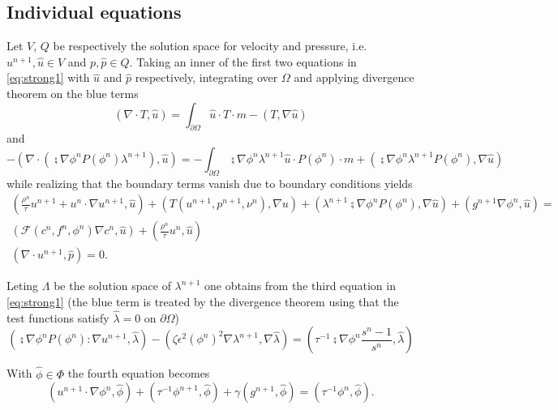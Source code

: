 \subsection*{Individual equations}
Let $V$, $Q$ be respectively the solution space for velocity and pressure, i.e.
$u^{n+1}, \hat{u}\in V$ and $p, \hat{p}\in Q$. Taking an inner of the first two equations
in \eqref{eq:strong1} with $\hat{u}$ and $\hat{p}$ respectively, integrating over
$\Omega$ and applying divergence theorem on the blue terms
%
\[
(\nabla\cdot T, \hat{u}) = \int_{\partial\Omega} \hat{u} \cdot T \cdot m - (T, \nabla{\hat{u}})
\]
and
\[
-(\nabla\cdot(\semi{\nabla \phi^n}P(\phi^n)\lambda^{n+1}), \hat{u})
=
-\int_{\partial\Omega} \semi{\nabla \phi^n}\lambda^{n+1} \hat{u}\cdot P(\phi^n)\cdot m
+
(\semi{\nabla \phi^n}\lambda^{n+1} P(\phi^n), \nabla\hat{u})
\]
%
while realizing that the boundary terms vanish due to boundary conditions
yields
%
\begin{equation}\label{eq:11}
\begin{aligned}
(\frac{\rho^n}{\tau}u^{n+1}+u^n\cdot\nabla u^{n+1}, \hat{u})+
(T(u^{n+1}, p^{n+1}, \nu^{n}), \nabla u) + (\lambda^{n+1}\semi{\nabla \phi^n} P(\phi^n), \nabla \hat{u})
+(g^{n+1}\nabla \phi^n, \hat{u}) =\\ (\mathcal{F}(c^n, f^n, \phi^n)\nabla c^n, \hat{u})+
(\frac{\rho^n}{\tau}u^{n}, \hat{u})\\
%
(\nabla\cdot u^{n+1}, \hat{p}) = 0.
\end{aligned}
\end{equation}
%

Leting $\Lambda$ be the solution space of $\lambda^{n+1}$ one obtains from
the third equation in \eqref{eq:strong1} (the blue term is treated by the
divergence theorem using that the test functions satisfy $\hat{\lambda}=0$
on $\partial\Omega$)
%
\begin{equation}\label{eq:12}
(\semi{\nabla \phi^{n}}P(\phi^n):\nabla u^{n+1}, \hat{\lambda})
-(\zeta\epsilon^2 (\phi^n)^2 \nabla\lambda^{n+1}, \nabla\hat{\lambda})
=(\tau^{-1}\semi{\nabla \phi^n}\frac{s^n-1}{s^n}, \hat{\lambda})
\end{equation}
%

With $\hat{\phi}\in \Phi$ the fourth equation becomes
%
\begin{equation}\label{eq:13}
(u^{n+1}\cdot \nabla\phi^n, \hat{\phi})+
(\tau^{-1}\phi^{n+1}, \hat{\phi})+
\gamma(g^{n+1}, \hat{\phi}) = (\tau^{-1}\phi^{n}, \hat{\phi})
.
\end{equation}
%

